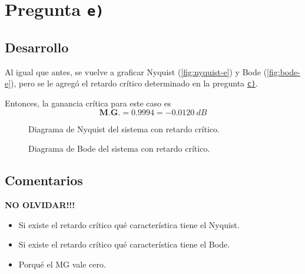 \section{Pregunta \texttt{e)}}\label{pregunta-e}

\subsection{Desarrollo}

Al igual que antes, se vuelve a graficar Nyquist (\autoref{fig:nyquist-e}) y
Bode (\autoref{fig:bode-e}), pero se le agregó el retardo crítico determinado
en la pregunta \hyperref[pregunta-c]{\texttt{c)}}.

Entonces, la ganancia crítica para este caso es
\begin{equation}
  \boxed{\textbf{M.G.} = 0.9994 = -0.0120\ \unit{dB}}
\end{equation}

\begin{figure}[h]
  \centering
  
  \caption{Diagrama de Nyquist del sistema con retardo crítico.}
  \label{fig:nyquist-e}
\end{figure}

\begin{figure}[h]
  \centering
  
  \caption{Diagrama de Bode del sistema con retardo crítico.}
  \label{fig:bode-e}
\end{figure}


\FloatBarrier
\subsection{Comentarios}

\textbf{NO OLVIDAR!!!}


\begin{itemize}
  \item Si existe el retardo crítico qué característica tiene el Nyquist.
  \item Si existe el retardo crítico qué característica tiene el Bode.
  \item Porqué el MG vale cero.
\end{itemize}

